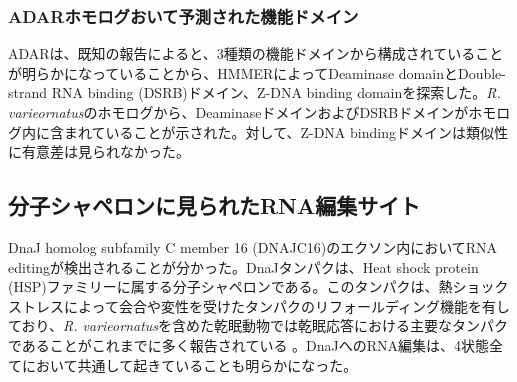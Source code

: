 \subsubsection{ADARホモログおいて予測された機能ドメイン}
ADARは、既知の報告によると、3種類の機能ドメインから構成されていることが明らかになっていることから、HMMERによってDeaminase domainとDouble-strand RNA binding (DSRB)ドメイン、Z-DNA binding domainを探索した。{\it R. varieornatus}のホモログから、DeaminaseドメインおよびDSRBドメインがホモログ内に含まれていることが示された。対して、Z-DNA bindingドメインは類似性に有意差は見られなかった。

\subsection{分子シャペロンに見られたRNA編集サイト}
DnaJ homolog subfamily C member 16 (DNAJC16)のエクソン内においてRNA editingが検出されることが分かった。DnaJタンパクは、Heat shock protein (HSP)ファミリーに属する分子シャペロンである。このタンパクは、熱ショックストレスによって会合や変性を受けたタンパクのリフォールディング機能を有しており、{\it R. varieornatus}を含めた乾眠動物では乾眠応答における主要なタンパクであることがこれまでに多く報告されている \citep{pmid20809134,pmid22281184}。DnaJへのRNA編集は、4状態全てにおいて共通して起きていることも明らかになった。

